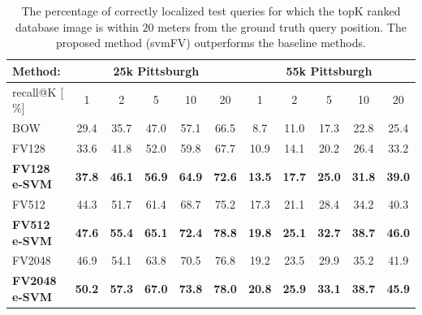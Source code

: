 \documentclass[table]{article} %
\begin{document}
\begin{table}[t!]
\begin{centering}
	\begin{tabularx}{0.94\linewidth}{|l|c c c c c|c c c c c|}
		\hline 
		\rowcolor{maroon!50}
		Method: & \multicolumn{5}{c|}{25k Pittsburgh} & \multicolumn{5}{c|}{55k Pittsburgh} \\
		\hline 
		\hline 
		\rowcolor{maroon!50}
		recall@K [$\%$] & 1 & 2 & 5 & 10 & 20 & 1 & 2 & 5 & 10 & 20\\
		\hline
		\rowcolor{maroon!10}
		BOW & 29.4 & 35.7 & 47.0 & 57.1 & 66.5 & 8.7 & 11.0 & 17.3 & 22.8 & 25.4  \\
        \hline
		\rowcolor{maroon!10}
		FV128         & 33.6 & 41.8 & 52.0 & 59.8 & 67.7 & 10.9 & 14.1 & 20.2 & 26.4 & 33.2 \\
		\rowcolor{maroon!10}
		\textbf{FV128 e-SVM}   & \textbf{37.8}  & \textbf{46.1} & \textbf{56.9} & \textbf{64.9} & \textbf{72.6}  &
                                 \textbf{13.5}  &  \textbf{17.7}  &  \textbf{25.0}  &  \textbf{31.8}  &  \textbf{39.0} \\
        \hline
        \rowcolor{maroon!10}
        FV512         & 44.3 & 51.7 & 61.4 & 68.7 & 75.2 & 17.3 &  21.1 &  28.4 &  34.2 &  40.3 \\
        \rowcolor{maroon!10}
        \textbf{FV512 e-SVM}   & \textbf{47.6}  & \textbf{55.4} & \textbf{65.1} & \textbf{72.4} & \textbf{78.8}  &
                                 \textbf{19.8} &  \textbf{25.1} &  \textbf{32.7}  & \textbf{38.7} &  \textbf{46.0} \\
        \hline
		\rowcolor{maroon!10}
		FV2048        & 46.9  & 54.1 & 63.8 & 70.5 & 76.8 & 19.2 & 23.5 & 29.9 &  35.2 &  41.9 \\
		\rowcolor{maroon!10}
		\textbf{FV2048 e-SVM}  & \textbf{50.2} & \textbf{57.3} & \textbf{67.0} & \textbf{73.8} & \textbf{78.0} &
        \textbf{20.8} & \textbf{25.9} & \textbf{33.1} & \textbf{38.7} & \textbf{45.9}\\
        \hline
	\end{tabularx}
	\caption{ \textcolor{myRed}{}
		The percentage of correctly localized test queries for which the topK ranked database image is within $20$ meters from the ground truth query position. The proposed method (svmFV) outperforms the baseline methods.
		}
    	\label{tab:recall}
    \end{centering}
    \end{table}
\end{document}
